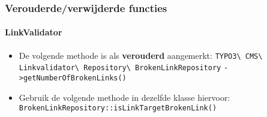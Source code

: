 
\begin{frame}[fragile]
	\frametitle{Verouderde/verwijderde functies}
	\framesubtitle{LinkValidator}

	\begin{itemize}
		\item De volgende methode is als \textbf{verouderd} aangemerkt:
		\newline\newline
			\smaller
				\texttt{TYPO3\textbackslash
					CMS\textbackslash
					Linkvalidator\textbackslash
					Repository\textbackslash
					BrokenLinkRepository}\newline
				\texttt{->getNumberOfBrokenLinks()}\normalsize\newline

		\item Gebruik de volgende methode in dezelfde klasse hiervoor:\newline
			\small\texttt{BrokenLinkRepository::isLinkTargetBrokenLink()}\normalsize

	\end{itemize}

\end{frame}


